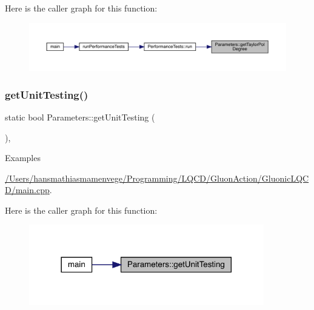 Here is the caller graph for this function\+:
\nopagebreak
\begin{figure}[H]
\begin{center}
\leavevmode
\includegraphics[width=350pt]{class_parameters_a272f8ebfbd305fb4a3b03db68417fc90_icgraph}
\end{center}
\end{figure}
\mbox{\label{class_parameters_a785042104e5f47f11d625ec346853174}} 
\subsubsection{\texorpdfstring{getUnitTesting()}{getUnitTesting()}}
{\footnotesize\ttfamily static bool Parameters\+::get\+Unit\+Testing (\begin{DoxyParamCaption}{ }\end{DoxyParamCaption})\hspace{0.3cm}{\ttfamily [inline]}, {\ttfamily [static]}}

\begin{Desc}
\item[Examples]\par
\mbox{\hyperlink{_2_users_2hansmathiasmamenvege_2_programming_2_l_q_c_d_2_gluon_action_2_gluonic_l_q_c_d_2main_8cpp-example}{/\+Users/hansmathiasmamenvege/\+Programming/\+L\+Q\+C\+D/\+Gluon\+Action/\+Gluonic\+L\+Q\+C\+D/main.\+cpp}}.\end{Desc}
Here is the caller graph for this function\+:
\nopagebreak
\begin{figure}[H]
\begin{center}
\leavevmode
\includegraphics[width=290pt]{class_parameters_a785042104e5f47f11d625ec346853174_icgraph}
\end{center}
\end{figure}
\mbox{\label{class_parameters_a2645617063e170828a3da439094ab626}} 
